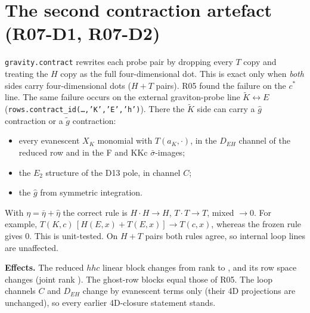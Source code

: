 \documentclass[11pt]{article}
\begin{document}
\section{The second contraction artefact (R07-D1, R07-D2)}
\texttt{gravity.contract} rewrites each probe pair by dropping every $T$ copy and treating the $H$ copy as the full
four-dimensional dot. This is exact only when \emph{both} sides carry four-dimensional dots ($H+T$ pairs). R05 found
the failure on the $c^*$ line. The same failure occurs on the external graviton-probe line $\tilde K\leftrightarrow E$
(\texttt{rows.contract\_id(\dots,'K','E','h')}). There the $\tilde K$ side can carry a $\hat g$ contraction or a
$\tilde g$ contraction:
\begin{itemize}
\item every evanescent $X_K$ monomial with $T(a_K,\cdot)$, in the $D_{EH}$ channel of the reduced row and in the F and
KKc $\bar\sigma$-images;
\item the $E_2$ structure of the D13 pole, in channel $C$;
\item the $\hat g$ from symmetric integration.
\end{itemize}
With $\eta=\bar\eta+\hat\eta$ the correct rule is $H\cdot H\to H$, $T\cdot T\to T$, mixed $\to0$. For example,
$T(K,c)\,[H(E,x)+T(E,x)]\to T(c,x)$, whereas the frozen rule gives $0$. This is unit-tested. On
$H+T$ pairs both rules agree, so internal loop lines are unaffected.

\textbf{Effects.} The reduced $hhc$ linear block changes from rank \BRo{} to \BRn{}, and its row space changes (joint rank
\BRj). The ghost-row blocks equal those of R05. The loop channels $C$ and $D_{EH}$ change by evanescent terms only (their
4D projections are unchanged), so every earlier 4D-closure statement stands.
\end{document}
